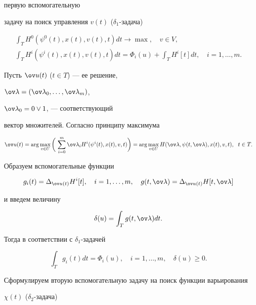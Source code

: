 первую вспомогательную 


задачу на поиск управления $v(t)$ ($\delta_1$-задача) 


\begin{gather*} 


\int_T H^0(\psi^0(t),x(t),v(t),t)dt\to\max,\quad v\in V,\\ 


\int_T H^i(\psi^i(t),x(t),v(t),t)dt= 


\Phi_i(u)+\int_T H^i[t]dt,\quad i=1,\dotsc,m. 


\end{gather*} 


Пусть $\ov u(t)$ ($t\in T$) --- ее решение, 


$\ov\lambda=(\ov\lambda_0,\dotsc,\ov\lambda_m)$, 


$\ov\lambda_0=0\vee 1$, --- соответствующий 


вектор множителей. Согласно принципу максимума 


$$ 


\ov u(t)=\arg\max_{v\in U}\bigg(\,\sum^m_{i=0} 


\ov\lambda_i H^i(\psi^i(t),x(t),v,t)\bigg)= 


\arg\max_{v\in U}H(\ov\lambda,\psi(t,\ov\lambda), 


x(t),v,t),\ \; t\in T. 


$$ 


Образуем вспомогательные функции 


$$ 


g_i(t)=\Delta_{\ov u(t)}H^i[t],\quad i=1,\dotsc,m,\quad 


g(t,\ov\lambda)=\Delta_{\ov u(t)}H[t,\ov\lambda] 


$$ 


и введем величину 


$$ 


\delta(u)=\int_T g(t,\ov\lambda)dt. 


$$ 


Тогда в соответствии с $\delta_1$-задачей 


$$ 


\int_T g_i(t)dt=\Phi_i(u),\quad i=1,\dotsc,m,\quad 


\delta(u)\ge 0. 


$$ 


 


Сформулируем вторую вспомогательную задачу на поиск функции варьирования 


$\chi(t)$ ($\delta_2$-задача) 



